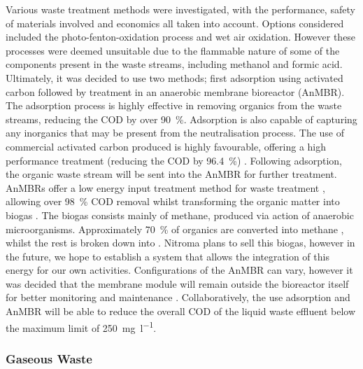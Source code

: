 Various waste treatment methods were investigated, with the performance,  safety of materials involved and economics all taken into account. Options considered included the photo-fenton-oxidation process and wet air oxidation. However these processes were deemed unsuitable due to the flammable nature of some of the components present in the waste streams, including methanol and formic acid. Ultimately, it was decided to use two methods; first adsorption using activated carbon followed by treatment in an anaerobic membrane bioreactor (AnMBR). The adsorption process is highly effective in removing organics from the waste streams, reducing the COD by over \SI{90}{\percent}. Adsorption is also capable of capturing any inorganics that may be present from the neutralisation process. The use of commercial activated carbon produced is highly favourable,  offering a high performance treatment (reducing the COD by \SI{96.4}{\percent}) \cite{aluyor_cod_2008}. Following adsorption, the organic waste stream will be sent into the AnMBR for further treatment. AnMBRs offer a low energy input treatment method for waste treatment \cite{maaz_anaerobic_2019}, allowing over \SI{98}{\percent} COD removal whilst transforming the organic matter into biogas \cite{chen_brewery_2016}. The biogas consists mainly of methane, produced via action of anaerobic microorganisms. Approximately \SI{70}{\percent} of organics are converted into methane \cite{ariunbaatar_performance_2021}, whilst the rest is broken down into . Nitroma plans to sell this biogas, however in the future, we hope to establish a system that allows the integration of this energy for our own activities. Configurations of the AnMBR can vary, however it was decided that the membrane module will remain outside the bioreactor itself for better monitoring and maintenance \cite{maaz_anaerobic_2019}. Collaboratively, the use adsorption and AnMBR will be able to reduce the overall COD of the liquid waste effluent below the maximum limit of \SI{250}{\mg\per\litre}. 

\subsubsection{Gaseous Waste}

